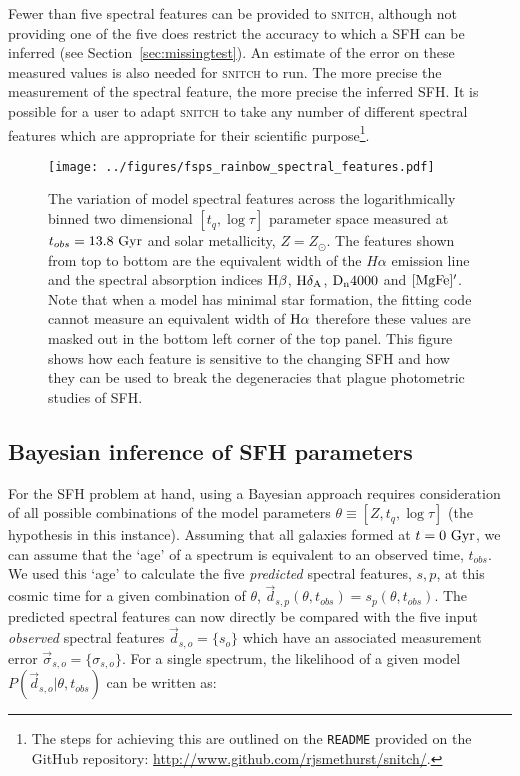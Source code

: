 \documentclass[useAMS,usenatbib]{mn2e}
\begin{document}
Fewer than five spectral features can be provided to \textsc{snitch}, although not providing one of the five does restrict the accuracy to which a SFH can be inferred (see Section~\ref{sec:missingtest}). An estimate of the error on these measured values is also needed for \textsc{snitch} to run. The more precise the measurement of the spectral feature, the more precise the inferred SFH. It is possible for a user to adapt \textsc{snitch} to take any number of different spectral features which are appropriate for their scientific purpose\footnote{The steps for achieving this are outlined on the \texttt{README} provided on the GitHub repository: \url{http://www.github.com/rjsmethurst/snitch/}.}.

\begin{figure}
\centering
\texttt{[image: ../figures/fsps\_rainbow\_spectral\_features.pdf]}
\caption{The variation of model spectral features across the logarithmically binned two dimensional $[t_q, \log \tau]$ parameter space measured at $t_{obs}=13.8~\rm{Gyr}$ and solar metallicity, $Z=Z_{\odot}$. The features shown from top to bottom are the equivalent width of the $H\alpha$ emission line and the spectral absorption indices $\rm{H}\beta$, $\rm{H}\delta_A$, $\rm{D}_n4000$ and $[\rm{MgFe}]^{\prime}$. Note that when a model has minimal star formation, the fitting code cannot measure an equivalent width of $\rm{H}\alpha$ therefore these values are masked out in the bottom left corner of the top panel. This figure shows how each feature is sensitive to the changing SFH and how they can be used to break the degeneracies that plague photometric studies of SFH. }
\label{fig:rainbow}
\end{figure}

\subsection{Bayesian inference of SFH parameters}\label{sec:emcee}

For the SFH problem at hand, using a Bayesian approach requires consideration of all possible combinations of the model parameters $\theta \equiv [Z, t_{q}, \log \tau]$ (the hypothesis in this instance). Assuming that all galaxies formed at $t=0~\rm{Gyr}$, we can assume that the `age' of a spectrum is equivalent to an observed time, $t_{obs}$. We used this  `age' to calculate the five \emph{predicted} spectral features, $s,p$, at this cosmic time for a given combination of $\theta$, $\vec{d}_{s,p}(\theta, t_{obs}) = {s_p(\theta, t_{obs})}$. The predicted spectral features can now directly be compared with the five input \emph{observed} spectral features $\vec{d}_{s, o} = \{s_o\}$ which have an associated measurement error $\vec{\sigma}_{s, o} = \{\sigma_{s, o}\}$. For a single spectrum, the likelihood of a given model $P(\vec{d}_{s, o}|\theta, t_{obs})$ can be written as:
\end{document}
